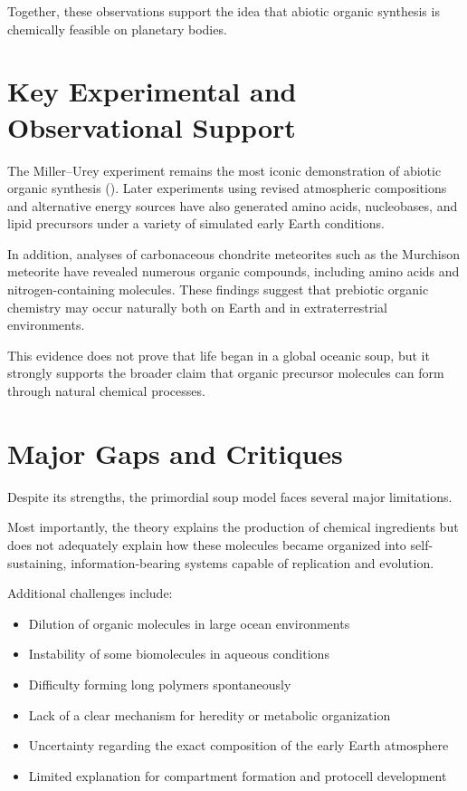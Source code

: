 \documentclass[
  oneside]{book}
\providecommand{\tightlist}{%
  \setlength{\itemsep}{0pt}\setlength{\parskip}{0pt}}
\begin{document}
Together, these observations support the idea that abiotic organic synthesis is chemically feasible on planetary bodies.

\section{Key Experimental and Observational Support}\label{key-experimental-and-observational-support}

The Miller--Urey experiment remains the most iconic demonstration of abiotic organic synthesis (). Later experiments using revised atmospheric compositions and alternative energy sources have also generated amino acids, nucleobases, and lipid precursors under a variety of simulated early Earth conditions.

In addition, analyses of carbonaceous chondrite meteorites such as the Murchison meteorite have revealed numerous organic compounds, including amino acids and nitrogen-containing molecules. These findings suggest that prebiotic organic chemistry may occur naturally both on Earth and in extraterrestrial environments.

This evidence does not prove that life began in a global oceanic soup, but it strongly supports the broader claim that organic precursor molecules can form through natural chemical processes.

\section{Major Gaps and Critiques}\label{major-gaps-and-critiques}

Despite its strengths, the primordial soup model faces several major limitations.

Most importantly, the theory explains the production of chemical ingredients but does not adequately explain how these molecules became organized into self-sustaining, information-bearing systems capable of replication and evolution.

Additional challenges include:

\begin{itemize}
\tightlist
\item
  Dilution of organic molecules in large ocean environments
\item
  Instability of some biomolecules in aqueous conditions
\item
  Difficulty forming long polymers spontaneously
\item
  Lack of a clear mechanism for heredity or metabolic organization
\item
  Uncertainty regarding the exact composition of the early Earth atmosphere
\item
  Limited explanation for compartment formation and protocell development
\end{itemize}
\end{document}
